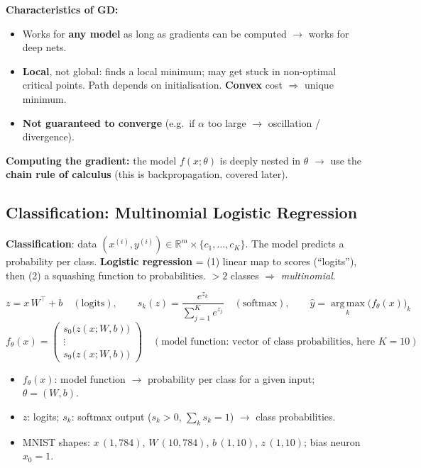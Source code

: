 \documentclass[10pt,a4paper]{article}
\begin{document}
	\begin{importantbox}
		\textbf{Characteristics of GD:}
		\begin{itemize}[leftmargin=*]
			\item Works for \textbf{any model} as long as gradients can be computed $\rightarrow$ works for deep nets.
			\item \textbf{Local}, not global: finds a local minimum; may get stuck in non-optimal critical points. Path depends on initialisation. \textbf{Convex} cost $\Rightarrow$ unique minimum.
			\item \textbf{Not guaranteed to converge} (e.g.\ if $\alpha$ too large $\rightarrow$ oscillation / divergence).
		\end{itemize}
	\end{importantbox}

	\textbf{Computing the gradient:} the model $f(x;\theta)$ is deeply nested in $\theta$ $\rightarrow$ use the \textbf{chain rule of calculus} (this is backpropagation, covered later).

	\subsection{Classification: Multinomial Logistic Regression}

	\begin{definitionbox}
		\textbf{Classification}: data $(x^{(i)},y^{(i)})\in\mathbb{R}^m\times\{c_1,\dots,c_K\}$. The model predicts a probability per class. \textbf{Logistic regression} = (1) linear map to scores (``logits''), then (2) a squashing function to probabilities. $>2$ classes $\Rightarrow$ \emph{multinomial}.
	\end{definitionbox}

	\begin{formulabox}
		\[
		z = x\,W^\top + b \quad(\text{logits}), \qquad
		s_k(z) = \frac{e^{z_k}}{\sum_{j=1}^{K} e^{z_j}} \quad(\text{softmax}), \qquad
		\hat y = \operatorname*{arg\,max}_k \big(f_\theta(x)\big)_k
		\]
		\[
		f_\theta(x)=\begin{pmatrix} s_0\big(z(x;W,b)\big)\\[-1pt] \vdots \\[-1pt] s_9\big(z(x;W,b)\big) \end{pmatrix}
		\quad(\text{model function: vector of class probabilities, here }K{=}10)
		\]
	\end{formulabox}
	\begin{itemize}[leftmargin=*]
		\item $f_\theta(x)$: model function $\rightarrow$ probability per class for a given input; $\theta=(W,b)$.
		\item $z$: logits; \quad $s_k$: softmax output ($s_k>0$, $\sum_k s_k=1$) $\rightarrow$ class probabilities.
		\item MNIST shapes: $x\,(1,784)$, $W\,(10,784)$, $b\,(1,10)$, $z\,(1,10)$; bias neuron $x_0=1$.
	\end{itemize}
\end{document}
